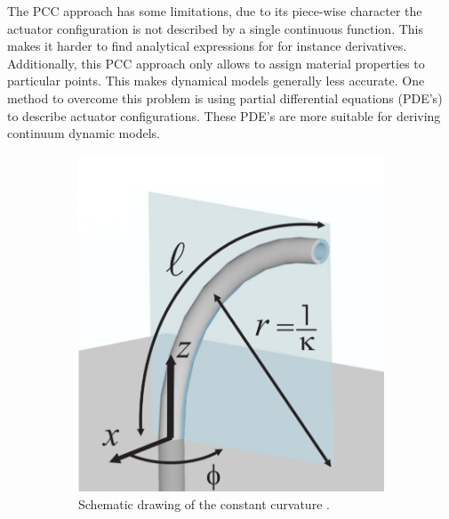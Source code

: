 The PCC approach has some limitations, due to its piece-wise character the actuator configuration is not described by a single continuous function. This makes it harder to find analytical expressions for for instance derivatives. Additionally, this PCC approach only allows to assign material properties to particular points. This makes dynamical models generally less accurate. One method to overcome this problem is using partial differential equations (PDE's) to describe actuator configurations. These PDE's are more suitable for deriving continuum dynamic models. 




\begin{figure}[H]
  \begin{minipage}{\linewidth}
      \centering
      \begin{minipage}{0.45\linewidth}
        \begin{figure}[H]
        \centering
        \includegraphics[width=0.85\linewidth]{Figures/Chapter2/ccapproach.png}
         \caption{Schematic drawing of the constant curvature \cite{ccapproach}.}
         \label{fig2:ccapproach}
        \end{figure}
      \end{minipage}
      \hspace{0.05\linewidth}
      \begin{minipage}{0.45\linewidth}
          \begin{figure}[H]

\end{figure}
\end{minipage}
\end{minipage}
\end{figure}
